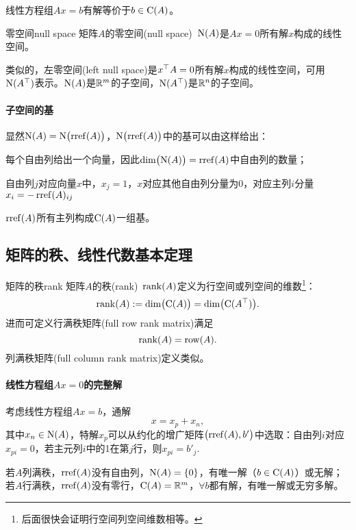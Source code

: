 线性方程组$Ax=b$有解等价于$b\in\operatorname{C}(A)$。
\begin{definition}{零空间}{null space}
	矩阵$A$的零空间(null space)~$\operatorname{N}(A)$是$Ax=0$所有解$x$构成的线性空间。
\end{definition}
类似的，左零空间(left null space)是$x^\top A=0$所有解$x$构成的线性空间，可用$\operatorname{N}(A^\top)$表示。$\operatorname{N}(A)$是$\mathbb R^m$的子空间，$\operatorname{N}(A^\top)$是$\mathbb R^n$的子空间。
\paragraph{子空间的基}
显然$\operatorname{N}(A)=\operatorname{N}\bigl(\operatorname{rref}(A)\bigr)$，$\operatorname{N}\bigl(\operatorname{rref}(A)\bigr)$中的基可以由这样给出：
\begin{compactitem}
	\item 每个自由列给出一个向量，因此$\dim\bigl(\operatorname{N}(A)\bigr)=\operatorname{rref}(A)$中自由列的数量；
	\item 自由列$j$对应向量$x$中，$x_j=1$，$x$对应其他自由列分量为0，对应主列$i$分量$x_i=-\operatorname{rref}(A)_{ij}$
\end{compactitem}
$\operatorname{rref}(A)$所有主列构成$\operatorname{C}(A)$一组基。
\subsection{矩阵的秩、线性代数基本定理}
\begin{definition}{矩阵的秩}{rank}
	矩阵$A$的秩(rank)~$\operatorname{rank}(A)$定义为行空间或列空间的维数\footnote{后面很快会证明行空间列空间维数相等。}：
	\[
		\operatorname{rank}(A):=\dim\bigl(\operatorname{C}(A)\bigr)=\dim\bigl(\operatorname{C}(A^\top)\bigr).
	\]
	进而可定义行满秩矩阵(full row rank matrix)满足
	\[
		\operatorname{rank}(A)=\operatorname{row}(A).
	\]
	列满秩矩阵(full column rank matrix)定义类似。
\end{definition}
\paragraph{线性方程组$Ax=0$的完整解}考虑线性方程组$Ax=b$，通解
\[
	x=x_p+x_n,
\]
其中$x_n\in\operatorname{N}(A)$，特解$x_p$可以从约化的增广矩阵$\bigl(\operatorname{rref}(A),b'\bigr)$中选取：自由列$i$对应$x_{pi}=0$，若主元列$i$中的1在第$j$行，则$x_{pi}=b'_j.$

若$A$列满秩，$\operatorname{rref}(A)$没有自由列，$\operatorname{N}(A)=\{0\}$，有唯一解（$b\in\operatorname{C}(A)$）或无解；
若$A$行满秩，$\operatorname{rref}(A)$没有零行，$\operatorname{C}(A)=\mathbb R^m$，$\forall b$都有解，有唯一解或无穷多解。
